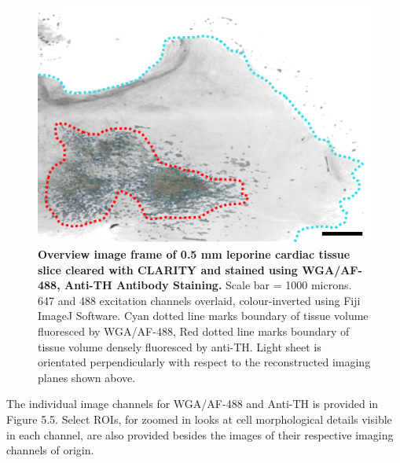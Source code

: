 \begin{figure}[H]
    \centering
    \includegraphics[width=1\linewidth]{Images/Anti_TH_Overview2.png}
    \caption{\textbf{Overview image frame of 0.5 mm leporine cardiac tissue slice cleared with CLARITY and stained using WGA/AF-488, Anti-TH Antibody Staining.} Scale bar = 1000 microns. 647 and 488 excitation channels overlaid, colour-inverted using Fiji ImageJ Software. Cyan dotted line marks boundary of tissue volume fluoresced by WGA/AF-488, Red dotted line marks boundary of tissue volume densely fluoresced by anti-TH. Light sheet is orientated perpendicularly with respect to the reconstructed imaging planes shown above.}
\end{figure}
\medskip

 The individual image channels for WGA/AF-488 and Anti-TH is provided in Figure 5.5. Select ROIs, for zoomed in looks at cell morphological details visible in each channel, are also provided besides the images of their respective imaging channels of origin.

